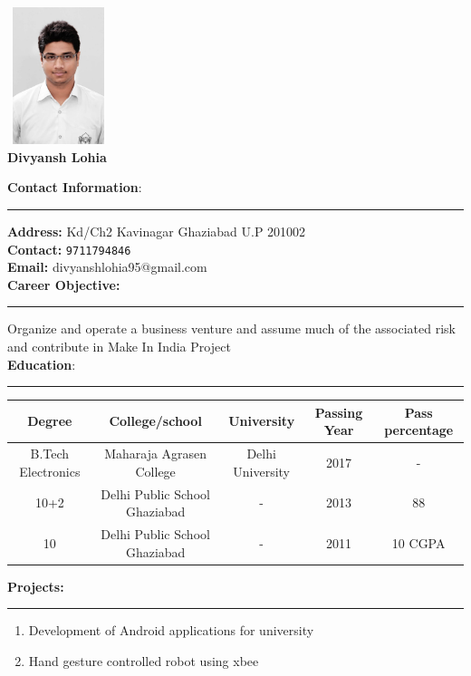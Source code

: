 \documentclass[a4paper,10pt]{article}
\begin{document}
\begin{flushright}
\includegraphics[width=3cm, height=4cm]{dev.jpg}\\
\large
\textbf{\bigskip Divyansh Lohia}
\end{flushright}


\begin{flushleft}
	\textbf{\large Contact Information}:\\
	\hrule
	\bigskip
	\textbf{Address:}            Kd/Ch2 Kavinagar Ghaziabad U.P 201002\\
	\textbf{Contact:}   \texttt{9711794846}\\
	\textbf{Email:}             divyanshlohia95@gmail.com\\ 
	\bigskip
    \textbf{\large Career Objective:}\\
    \hrule
    \smallskip
    Organize and operate a business venture and assume much of the associated risk and contribute in Make 	In India Project\\
	\bigskip
	\textbf{\large  Education}:\\
	\hrule
	\bigskip
	\begin{tabular}{|c|c|c|c|c|}
   		\hline \textbf{ Degree}  & \textbf{College/school}  & \textbf{University} & \textbf{Passing Year} 			& 		\textbf{ Pass percentage} \\ 
   		\hline B.Tech Electronics & Maharaja Agrasen College  & Delhi University & 2017 & - \\ 
   		\hline 
			10+2 & Delhi Public School Ghaziabad & - & 2013 & 88 \\
    	\hline
    		10 & Delhi Public School Ghaziabad & - & 2011 & 10 CGPA \\
    		\hline
	\end{tabular}
    \textbf{\large Projects:}\\
    \hrule
      \begin{enumerate}
      	\item  Development of Android applications for university
      	\item  Hand gesture controlled robot using xbee

\end{enumerate}
\end{flushleft}
\end{document}
